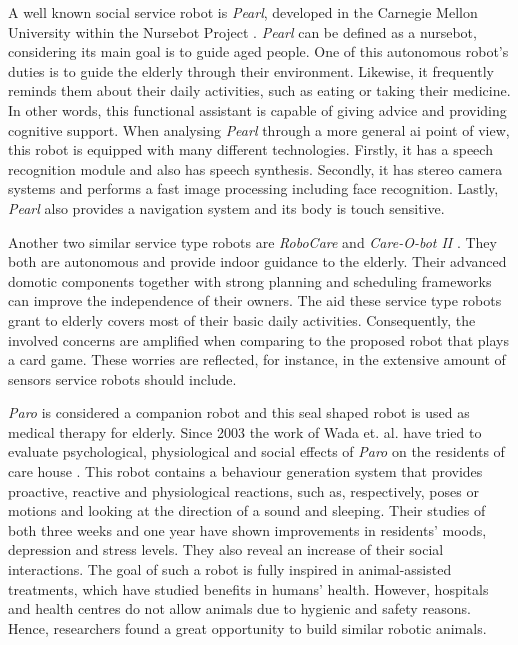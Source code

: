 A well known social service robot is \emph{Pearl}, developed in the Carnegie Mellon University within the Nursebot Project \cite{Pollack2002}.
\emph{Pearl} can be defined as a nursebot, considering its main goal is to guide aged people.
One of this autonomous robot's duties is to guide the elderly through their environment.
Likewise, it frequently reminds them about their daily activities, such as eating or taking their medicine.
In other words, this functional assistant is capable of giving advice and providing cognitive support.
When analysing \emph{Pearl} through a more general \gls{ai} point of view, this robot is equipped with many different technologies.
Firstly, it has a speech recognition module and also has speech synthesis.
Secondly, it has stereo camera systems and performs a fast image processing including face recognition.
Lastly, \emph{Pearl} also provides a navigation system and its body is touch sensitive.

Another two similar service type robots are \emph{RoboCare} \cite{Bahadori} and \emph{Care-O-bot II} \cite{Graf2004}.
They both are autonomous and provide indoor guidance to the elderly.
Their advanced domotic components together with strong planning and scheduling frameworks can improve the independence of their owners.
The aid these service type robots grant to elderly covers most of their basic daily activities.
Consequently, the involved concerns are amplified when comparing to the proposed robot that plays a card game.
These worries are reflected, for instance, in the extensive amount of sensors service robots should include.

\emph{Paro} is considered a companion robot and this seal shaped robot is used as medical therapy for elderly.
Since 2003 the work of Wada et. al. have tried to evaluate psychological, physiological and social effects of \emph{Paro} on the residents of care house \cite{Wada2003,Wada2005,Wada2007}.
This robot contains a behaviour generation system that provides proactive, reactive and physiological reactions, such as, respectively, poses or motions and looking at the direction of a sound and sleeping.
Their studies of both three weeks and one year have shown improvements in residents' moods, depression and stress levels.
They also reveal an increase of their social interactions.
The goal of such a robot is fully inspired in animal-assisted treatments, which have studied benefits in humans' health.
However, hospitals and health centres do not allow animals due to hygienic and safety reasons.
Hence, researchers found a great opportunity to build similar robotic animals.

